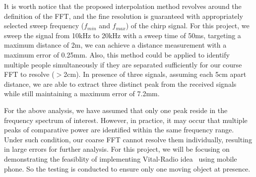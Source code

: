 It is worth notice that the proposed interpolation method revolves around the definition of the FFT, and the fine resolution is guaranteed with appropriately selected sweep frequency ($f_{min}$ and $f_{max}$) of the chirp signal. For this project, we sweep the signal from 10kHz to 20kHz with a sweep time of 50ms, targeting a maximum distance of 2m, we can achieve a distance measurement with a maximum error of 0.25mm. Also, this method could be applied to identify multiple people simultaneously if they are separated sufficiently for our course FFT to resolve ($>$2cm). In presence of three signals, assuming each 5cm apart distance, we are able to extract three distinct peak from the received signals while still maintaining a maximum error of 7.2mm.

For the above analysis, we have assumed that only one peak reside in the frequency spectrum of interest. However, in practice, it may occur that multiple peaks of comparative power are identified within the same frequency range. Under such condition, our coarse FFT cannot resolve them individually, resulting in large errors for further analysis. For this project, we will be focusing on demonstrating the feasiblity of implementing Vital-Radio idea~\cite{Adib_acm15} using mobile phone. So the testing is conducted to ensure only one moving object at presence.





